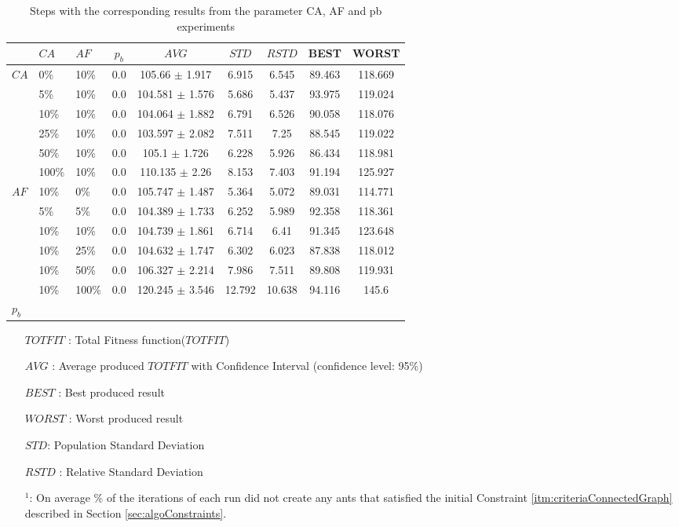 \begin{sidewaystable}
    \centering
    \begin{tabular}{|l|l|l|c||c|c|c|c|c|}
    \hline
    ~ & $CA$ & $AF$ & $p_b$ & $AVG$ & $STD$ & $RSTD$ & BEST & WORST \\
    \hline
    $CA$ & 0\% & 10\% & 0.0 & 105.66 $\pm$ 1.917 & 6.915 & 6.545 & 89.463 & 118.669\\
    ~ & 5\% & 10\% & 0.0 & 104.581 $\pm$ 1.576 & 5.686 & 5.437 & 93.975 & 119.024\\
    ~ & 10\% & 10\% & 0.0 & 104.064 $\pm$ 1.882 & 6.791 & 6.526 & 90.058 & 118.076\\
    ~ & 25\% & 10\% & 0.0 & 103.597 $\pm$ 2.082 & 7.511 & 7.25 & 88.545 & 119.022\\
    ~ & 50\% & 10\% & 0.0 & 105.1 $\pm$ 1.726 & 6.228 & 5.926 & 86.434 & 118.981\\
    ~ & 100\% & 10\% & 0.0 & 110.135 $\pm$ 2.26 & 8.153 & 7.403 & 91.194 & 125.927\\
    \hline
    $AF$ & 10\% & 0\% & 0.0 & 105.747 $\pm$ 1.487 & 5.364 & 5.072 & 89.031 & 114.771\\
    ~ & 5\% & 5\% & 0.0 & 104.389 $\pm$ 1.733 & 6.252 & 5.989 & 92.358 & 118.361\\
    ~ & 10\% & 10\% & 0.0 & 104.739 $\pm$ 1.861 & 6.714 & 6.41 & 91.345 & 123.648\\
    ~ & 10\% & 25\% & 0.0 & 104.632 $\pm$ 1.747 & 6.302 & 6.023 & 87.838 & 118.012\\
    ~ & 10\% & 50\% & 0.0 & 106.327 $\pm$ 2.214 & 7.986 & 7.511 & 89.808 & 119.931\\
    ~ & 10\% & 100\% & 0.0 & 120.245 $\pm$ 3.546 & 12.792 & 10.638 & 94.116 & 145.6\\
    \hline
    $p_b$ \\
  
    \hline
    \end{tabular}
    \caption {Steps with the corresponding results from the parameter CA, AF and pb experiments}
    \tiny
    \begin{itemize}[noitemsep]
    \item[$TOTFIT$ :] Total Fitness function($TOTFIT$)
    \item[$AVG$ :] Average produced $TOTFIT$ with Confidence Interval (confidence level: 95\%)
    \item[$BEST$ :] Best produced result
    \item[$WORST$ :] Worst produced result
    \item[$STD$:] Population Standard Deviation 
    \item[$RSTD$ :] Relative Standard Deviation 
    \item[$^1$:] On average \% of the iterations of each run did not create any ants that satisfied the initial Constraint \ref{itm:criteriaConnectedGraph} described in Section \vref{sec:algoConstraints}.
    \end{itemize}
    \label{table:pm2}
\end{sidewaystable}


